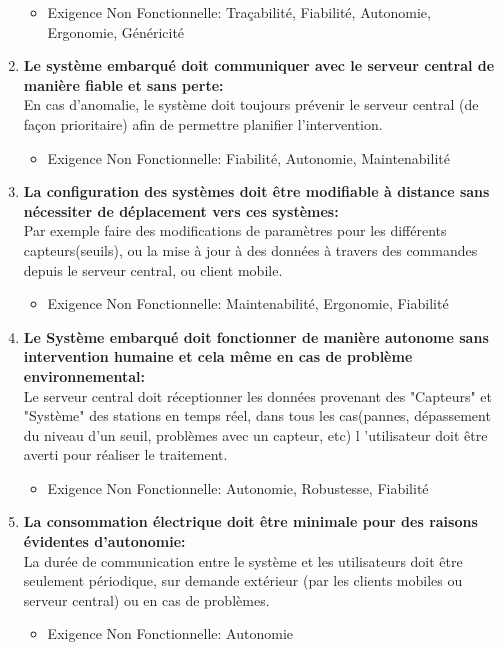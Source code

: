 \begin{enumerate}
\begin{itemize}
\item Exigence Non Fonctionnelle: Traçabilité, Fiabilité, Autonomie, Ergonomie, Généricité
\end{itemize}
\item  \textbf{Le système embarqué doit communiquer avec le serveur central de manière fiable et sans perte:}\\
En cas d'anomalie, le système doit toujours prévenir le serveur central (de façon prioritaire) 
afin de permettre planifier l'intervention.
\begin{itemize}

\item Exigence Non Fonctionnelle: Fiabilité, Autonomie, Maintenabilité
\end{itemize}
\item  \textbf{La configuration des systèmes doit être modifiable à distance sans nécessiter de déplacement vers ces systèmes:}\\
Par exemple faire des modifications de paramètres pour les différents capteurs(seuils), 
ou la mise à jour à des données à travers des commandes depuis le serveur central, ou client mobile.
\begin{itemize}

\item Exigence Non Fonctionnelle: Maintenabilité, Ergonomie, Fiabilité
\end{itemize}
\item  \textbf{Le Système embarqué doit fonctionner de manière autonome sans intervention humaine et cela même en cas de problème environnemental:}\\
Le serveur central doit réceptionner les données provenant des "Capteurs" et "Système" 
des stations en temps réel, dans tous les cas(pannes, dépassement du niveau d'un seuil, problèmes avec un capteur, etc) l
'utilisateur doit être averti pour réaliser le traitement.
\begin{itemize}

\item Exigence Non Fonctionnelle: Autonomie, Robustesse, Fiabilité
\end{itemize}
\item  \textbf{ La consommation électrique doit être minimale pour des raisons évidentes d’autonomie:}\\
La durée de communication entre le système et les utilisateurs doit être 
seulement périodique, sur demande extérieur (par les clients mobiles ou serveur central) ou en cas de problèmes.
\begin{itemize}

\item Exigence Non Fonctionnelle: Autonomie
\end{itemize}
\end{enumerate}

